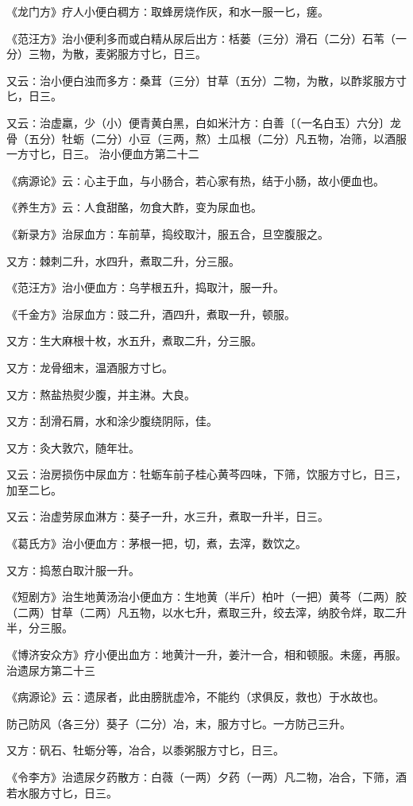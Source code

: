 \documentclass[a4paper,12pt,UTF8,twoside]{ctexbook}
\begin{document}
《龙门方》疗人小便白稠方∶取蜂房烧作灰，和水一服一匕，瘥。

《范汪方》治小便利多而或白精从尿后出方∶栝蒌（三分）滑石（二分）石苇（一分）三物，为散，麦粥服方寸匕，日三。

又云∶治小便白浊而多方∶桑茸（三分）甘草（五分）二物，为散，以酢浆服方寸匕，日三。

又云∶治虚羸，少（小）便青黄白黑，白如米汁方∶白善〔（一名白玉）六分〕龙骨（五分）牡蛎（二分）小豆（三两，熬）土瓜根（二分）凡五物，冶筛，以酒服一方寸匕，日三。
治小便血方第二十二

《病源论》云∶心主于血，与小肠合，若心家有热，结于小肠，故小便血也。

《养生方》云∶人食甜酪，勿食大酢，变为尿血也。

《新录方》治尿血方∶车前草，捣绞取汁，服五合，旦空腹服之。

又方∶棘刺二升，水四升，煮取二升，分三服。

《范汪方》治小便血方∶乌芋根五升，捣取汁，服一升。

《千金方》治尿血方∶豉二升，酒四升，煮取一升，顿服。

又方∶生大麻根十枚，水五升，煮取二升，分三服。

又方∶龙骨细末，温酒服方寸匕。

又方∶熬盐热熨少腹，并主淋。大良。

又方∶刮滑石屑，水和涂少腹绕阴际，佳。

又方∶灸大敦穴，随年壮。

又云∶治房损伤中尿血方∶牡蛎车前子桂心黄芩四味，下筛，饮服方寸匕，日三，加至二匕。

又云∶治虚劳尿血淋方∶葵子一升，水三升，煮取一升半，日三。

《葛氏方》治小便血方∶茅根一把，切，煮，去滓，数饮之。

又方∶捣葱白取汁服一升。

《短剧方》治生地黄汤治小便血方∶生地黄（半斤）柏叶（一把）黄芩（二两）胶（二两）甘草（二两）凡五物，以水七升，煮取三升，绞去滓，纳胶令烊，取二升半，分三服。

《博济安众方》疗小便出血方∶地黄汁一升，姜汁一合，相和顿服。未瘥，再服。
治遗尿方第二十三

《病源论》云∶遗尿者，此由膀胱虚冷，不能约（求俱反，救也）于水故也。

防己防风（各三分）葵子（二分）冶，末，服方寸匕。一方防己三升。

又方∶矾石、牡蛎分等，冶合，以黍粥服方寸匕，日三。

《令李方》治遗尿夕药散方∶白薇（一两）夕药（一两）凡二物，冶合，下筛，酒若水服方寸匕，日三。
\end{document}
